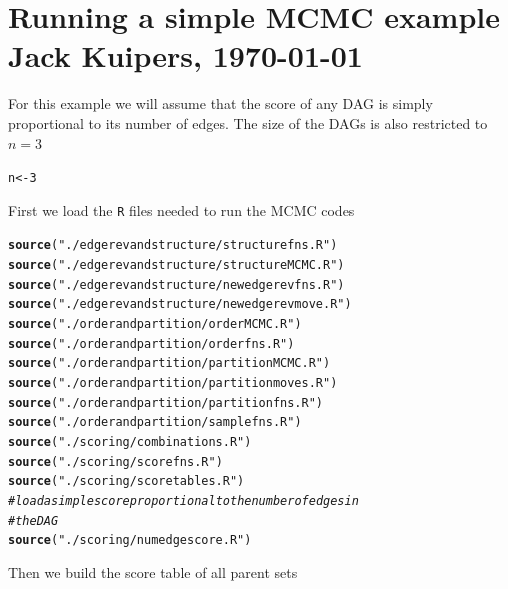 \documentclass[a4paper]{article}\usepackage[]{graphicx}\usepackage[]{color}
\makeatletter
\newcommand{\hlnum}[1]{\textcolor[rgb]{0.686,0.059,0.569}{#1}}%
\newcommand{\hlstr}[1]{\textcolor[rgb]{0.192,0.494,0.8}{#1}}%
\newcommand{\hlcom}[1]{\textcolor[rgb]{0.678,0.584,0.686}{\textit{#1}}}%
\newcommand{\hlstd}[1]{\textcolor[rgb]{0.345,0.345,0.345}{#1}}%
\newcommand{\hlkwb}[1]{\textcolor[rgb]{0.69,0.353,0.396}{#1}}%
\newcommand{\hlkwd}[1]{\textcolor[rgb]{0.737,0.353,0.396}{\textbf{#1}}}%
\newenvironment{kframe}{%
 \def\at@end@of@kframe{}%
 \ifinner\ifhmode%
  \def\at@end@of@kframe{\end{minipage}}%
  \begin{minipage}{\columnwidth}%
 \fi\fi%
 \def\FrameCommand##1{\hskip\@totalleftmargin \hskip-\fboxsep
 \colorbox{shadecolor}{##1}\hskip-\fboxsep
     \hskip-\linewidth \hskip-\@totalleftmargin \hskip\columnwidth}%
 \MakeFramed {\advance\hsize-\width
   \@totalleftmargin\z@ \linewidth\hsize
   \@setminipage}}%
 {\par\unskip\endMakeFramed%
 \at@end@of@kframe}
\newenvironment{knitrout}{}{} %
\newcommand{\nn}{\noindent}
\makeatother
\begin{document}
\section*{Running a simple MCMC example \hfill \normalsize{\textnormal{Jack Kuipers, \today}}}

\nn For this example we will assume that the score of any DAG is simply proportional to its number of edges.  The size of the DAGs is also restricted to $n=3$

\begin{knitrout}
\color{fgcolor}\begin{kframe}
\begin{alltt}
\hlstd{n} \hlkwb{<-} \hlnum{3}
\end{alltt}
\end{kframe}
\end{knitrout}

\nn First we load the \texttt{R} files needed to run the MCMC codes
\begin{knitrout}
\color{fgcolor}\begin{kframe}
\begin{alltt}
\hlkwd{source}\hlstd{(}\hlstr{"./edgerevandstructure/structurefns.R"}\hlstd{)}
\hlkwd{source}\hlstd{(}\hlstr{"./edgerevandstructure/structureMCMC.R"}\hlstd{)}
\hlkwd{source}\hlstd{(}\hlstr{"./edgerevandstructure/newedgerevfns.R"}\hlstd{)}
\hlkwd{source}\hlstd{(}\hlstr{"./edgerevandstructure/newedgerevmove.R"}\hlstd{)}
\hlkwd{source}\hlstd{(}\hlstr{"./orderandpartition/orderMCMC.R"}\hlstd{)}
\hlkwd{source}\hlstd{(}\hlstr{"./orderandpartition/orderfns.R"}\hlstd{)}
\hlkwd{source}\hlstd{(}\hlstr{"./orderandpartition/partitionMCMC.R"}\hlstd{)}
\hlkwd{source}\hlstd{(}\hlstr{"./orderandpartition/partitionmoves.R"}\hlstd{)}
\hlkwd{source}\hlstd{(}\hlstr{"./orderandpartition/partitionfns.R"}\hlstd{)}
\hlkwd{source}\hlstd{(}\hlstr{"./orderandpartition/samplefns.R"}\hlstd{)}
\hlkwd{source}\hlstd{(}\hlstr{"./scoring/combinations.R"}\hlstd{)}
\hlkwd{source}\hlstd{(}\hlstr{"./scoring/scorefns.R"}\hlstd{)}
\hlkwd{source}\hlstd{(}\hlstr{"./scoring/scoretables.R"}\hlstd{)}
\hlcom{# load a simple score proportional to the number of edges in}
\hlcom{# the DAG}
\hlkwd{source}\hlstd{(}\hlstr{"./scoring/numedgescore.R"}\hlstd{)}
\end{alltt}
\end{kframe}
\end{knitrout}

\nn Then we build the score table of all parent sets
\end{document}
